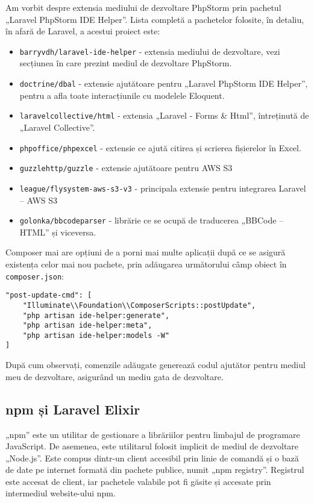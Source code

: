 		Am vorbit despre extensia mediului de dezvoltare PhpStorm prin pachetul „Laravel PhpStorm IDE Helper”.
		Lista completă a pachetelor folosite, în detaliu, în afară de Laravel, a acestui proiect este:

		\begin{itemize}
			\item \verb|barryvdh/laravel-ide-helper| - extensia mediului de dezvoltare, vezi secțiunea în care prezint mediul de dezvoltare PhpStorm.
			\item \verb|doctrine/dbal| - extensie ajutătoare pentru „Laravel PhpStorm IDE Helper”, pentru a afla toate interacțiunile cu modelele Eloquent.
			\item \verb|laravelcollective/html| - extensia „Laravel - Forms \& Html”, întreținută de „Laravel Collective”.
			\item \verb|phpoffice/phpexcel| - extensie ce ajută citirea și scrierea fișierelor în Excel.
			\item \verb|guzzlehttp/guzzle| - extensie ajutătoare pentru AWS S3
			\item \verb|league/flysystem-aws-s3-v3| - principala extensie pentru integrarea Laravel -- AWS S3
			\item \verb|golonka/bbcodeparser| - librărie ce se ocupă de traducerea „BBCode -- HTML” și viceversa.
		\end{itemize}

		Composer mai are opțiuni de a porni mai multe aplicații după ce se asigură existența celor mai nou pachete, prin adăugarea următorului câmp obiect în \verb|composer.json|:
		\begin{Verbatim}
"post-update-cmd": [
	"Illuminate\\Foundation\\ComposerScripts::postUpdate",
	"php artisan ide-helper:generate",
	"php artisan ide-helper:meta",
	"php artisan ide-helper:models -W"
]
	\end{Verbatim}
	După cum observați, comenzile adăugate generează codul ajutător pentru mediul meu de dezvoltare, asigurând un mediu gata de dezvoltare.

	\subsection{npm și Laravel Elixir}

		„npm” este un utilitar de gestionare a librăriilor pentru limbajul de programare JavaScript.
		De asemenea, este utilitarul folosit implicit de mediul de dezvoltare „Node.js”.
		Este compus dintr-un client accesibil prin linie de comandă și o bază de date pe internet formată din pachete publice, numit „npm registry”.
		Registrul este accesat de client, iar pachetele valabile pot fi găsite și accesate prin intermediul website-ului npm.\cite{npm}

